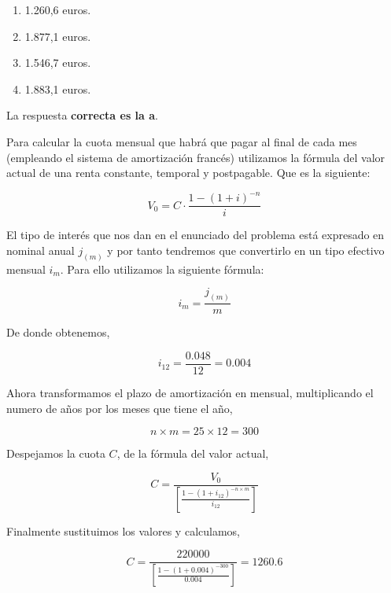 \documentclass[
  letterpaper,
  DIV=11,
  numbers=noendperiod]{scrreprt}
\begin{document}
\begin{enumerate}
\def\labelenumi{\alph{enumi})}
\item
  1.260,6 euros.
\item
  1.877,1 euros.
\item
  1.546,7 euros.
\item
  1.883,1 euros.
\end{enumerate}

\begin{tcolorbox}[enhanced jigsaw, left=2mm, opacityback=0, colback=white, breakable, arc=.35mm, bottomrule=.15mm, rightrule=.15mm, toprule=.15mm, leftrule=.75mm, colframe=quarto-callout-tip-color-frame]
\begin{minipage}[t]{5.5mm}
\textcolor{quarto-callout-tip-color}{\faLightbulb}
\end{minipage}%
\begin{minipage}[t]{\textwidth - 5.5mm}

La respuesta \textbf{correcta es la a}.

Para calcular la cuota mensual que habrá que pagar al final de cada mes
(empleando el sistema de amortización francés) utilizamos la fórmula del
valor actual de una renta constante, temporal y postpagable. Que es la
siguiente:

\[ { V }_{ 0 }= C\cdot \frac { 1-{ (1+i) }^{ - n } }{ i } \]

El tipo de interés que nos dan en el enunciado del problema está
expresado en nominal anual \(j _{(m)}\) y por tanto tendremos que
convertirlo en un tipo efectivo mensual \(i_m\). Para ello utilizamos la
siguiente fórmula:

\[i_m=\frac{j _{(m)}}{m}\]

De donde obtenemos,

\[i_{12}=\frac{0.048}{12}=0.004\]

Ahora transformamos el plazo de amortización en mensual, multiplicando
el numero de años por los meses que tiene el año,

\[n\times m=25\times 12=300\]

Despejamos la cuota \(C\), de la fórmula del valor actual,

\[C=\frac { { V }_{ 0 } }{ \left[ \frac { 1-{ (1+i _{12}) }^{ - n\times m } }{ i _{12} }  \right]  } \]

Finalmente sustituimos los valores y calculamos,

\[C=\frac { 220000 }{ \left[ \frac { 1-{ (1+0.004) }^{ -300 } }{ 0.004 }  \right]  } = 1260.6\]

\end{minipage}%
\end{tcolorbox}
\end{document}

